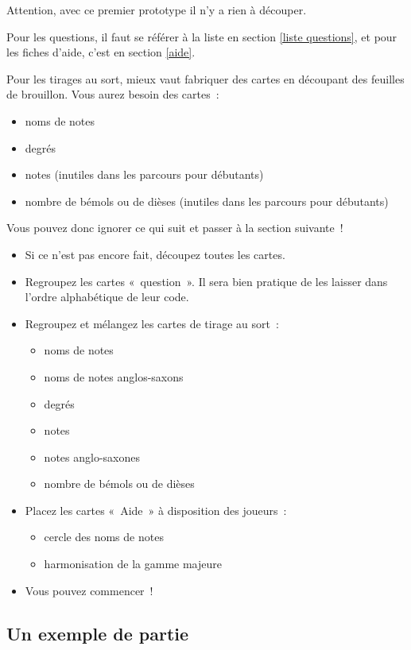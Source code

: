 \documentclass[11pt]{article}
\begin{document}
Attention, avec ce premier prototype il n’y a rien à découper.

Pour les questions, il faut se référer à la liste en section
\ref{liste questions}, et pour les fiches d’aide, c’est en section
\ref{aide}.

Pour les tirages au sort, mieux vaut fabriquer des cartes en découpant des
feuilles de brouillon. Vous aurez besoin des cartes :

\begin{itemize}
\item noms de notes
\item degrés
\item notes (inutiles dans les parcours pour débutants)
\item nombre de bémols ou de dièses (inutiles dans les parcours pour débutants)
\end{itemize}

Vous pouvez donc ignorer ce qui suit et passer à la section suivante !

\begin{itemize}
\item Si ce n’est pas encore fait, découpez toutes les cartes.
\item Regroupez les cartes « question ». Il sera bien pratique de les laisser
    dans l’ordre alphabétique de leur code.
\item Regroupez et mélangez les cartes de tirage au sort :
    \begin{itemize}
    \item noms de notes
    \item noms de notes anglos-saxons
    \item degrés
    \item notes
    \item notes anglo-saxones
    \item nombre de bémols ou de dièses
    \end{itemize}
\item Placez les cartes « Aide » à disposition des joueurs :
    \begin{itemize}
    \item cercle des noms de notes
    \item harmonisation de la gamme majeure
    \end{itemize}
\item Vous pouvez commencer !
\end{itemize}

\subsection{Un exemple de partie}
\end{document}
